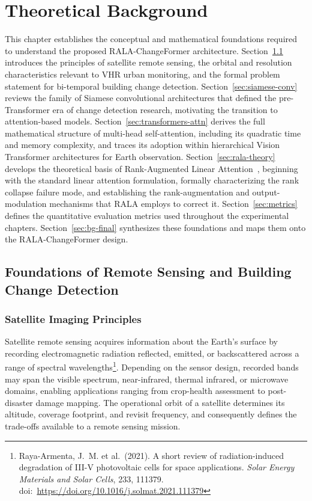 \chapter{Theoretical Background}
\label{chap:background}

This chapter establishes the conceptual and mathematical foundations required to understand the proposed RALA-ChangeFormer architecture. Section~\ref{sec:sat-imagery} introduces the principles of satellite remote sensing, the orbital and resolution characteristics relevant to \ac{VHR} urban monitoring, and the formal problem statement for bi-temporal building change detection. Section~\ref{sec:siamese-conv} reviews the family of Siamese convolutional architectures that defined the pre-Transformer era of change detection research, motivating the transition to attention-based models. Section~\ref{sec:transformers-attn} derives the full mathematical structure of multi-head self-attention, including its quadratic time and memory complexity, and traces its adoption within hierarchical Vision Transformer architectures for Earth observation. Section~\ref{sec:rala-theory} develops the theoretical basis of Rank-Augmented Linear Attention~\cite{Fan2025RALA}, beginning with the standard linear attention formulation, formally characterizing the rank collapse failure mode, and establishing the rank-augmentation and output-modulation mechanisms that \ac{RALA} employs to correct it. Section~\ref{sec:metrics} defines the quantitative evaluation metrics used throughout the experimental chapters. Section~\ref{sec:bg-final} synthesizes these foundations and maps them onto the RALA-ChangeFormer design.


\section{Foundations of Remote Sensing and Building Change Detection}
\label{sec:sat-imagery}

\subsection{Satellite Imaging Principles}

Satellite remote sensing acquires information about the Earth's surface by recording electromagnetic radiation reflected, emitted, or backscattered across a range of spectral wavelengths\footnote{Raya-Armenta, J.~M. et al.\ (2021). A short review of radiation-induced degradation of {III-V} photovoltaic cells for space applications. \textit{Solar Energy Materials and Solar Cells}, 233, 111379. doi:~\url{https://doi.org/10.1016/j.solmat.2021.111379}}. Depending on the sensor design, recorded bands may span the visible spectrum, near-infrared, thermal infrared, or microwave domains, enabling applications ranging from crop-health assessment to post-disaster damage mapping. The operational orbit of a satellite determines its altitude, coverage footprint, and revisit frequency, and consequently defines the trade-offs available to a remote sensing mission.

